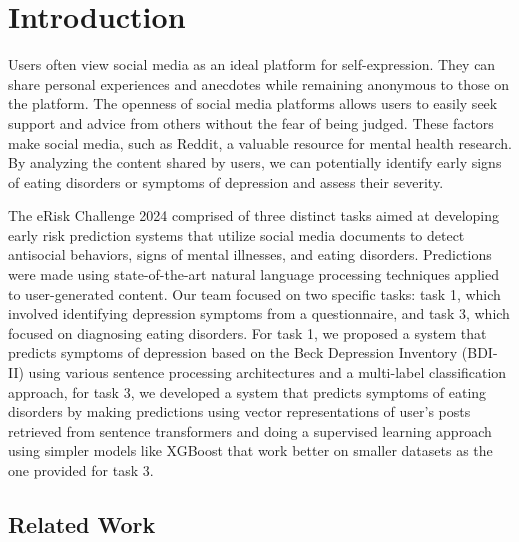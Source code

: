 \documentclass[]{style/ceurart}
\begin{document}
\section{Introduction}


Users often view social media as an ideal platform for self-expression. They can share personal experiences and anecdotes while remaining anonymous to those on the platform. The openness of social media platforms allows users to easily seek support and advice from others without the fear of being judged. These factors make social media, such as Reddit, a valuable resource for mental health research. By analyzing the content shared by users, we can potentially identify early signs of eating disorders or symptoms of depression and assess their severity.


The eRisk Challenge 2024 \cite{parapar_overview_2024, parapar_wn_overview_2024} comprised of three distinct tasks aimed at developing early risk prediction systems that utilize social media documents to detect antisocial behaviors, signs of mental illnesses, and eating disorders. Predictions were made using state-of-the-art natural language processing techniques applied to user-generated content. Our team focused on two specific tasks: task 1, which involved identifying depression symptoms from a questionnaire, and task 3, which focused on diagnosing eating disorders. For task 1, we proposed a system that predicts symptoms of depression based on the Beck Depression Inventory (BDI-II)\cite{beck_beck_1996} using various sentence processing architectures and a multi-label classification approach, for task 3, we developed a system that predicts symptoms of eating disorders by making predictions using vector representations of user's posts retrieved from sentence transformers and doing a supervised learning approach using simpler models like XGBoost that work better on smaller datasets as the one provided for task 3.

\subsection{Related Work}

\end{document}
